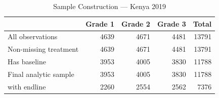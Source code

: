 \begin{table}[htbp]
\centering
\small
\caption{Sample Construction --- Kenya 2019}
\label{tab:ke2_sampleflow}
\begin{tabular}{l*{4}{r}}
\toprule
 & Grade 1 & Grade 2 & Grade 3 & Total \\
\midrule
All observations & 4639 & 4671 & 4481 & 13791 \\
Non-missing treatment & 4639 & 4671 & 4481 & 13791 \\
Has baseline & 3953 & 4005 & 3830 & 11788 \\
Final analytic sample & 3953 & 4005 & 3830 & 11788 \\
\quad with endline & 2260 & 2554 & 2562 & 7376 \\
\bottomrule
\end{tabular}
\end{table}
